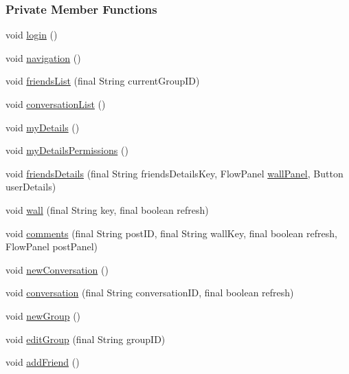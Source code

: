 \subsubsection*{Private Member Functions}
\begin{DoxyCompactItemize}
\item 
void \hyperlink{classballmerpeak_1_1turtlenet_1_1client_1_1frontend_a0e5a972d2f4619b2ebc2257ae1ca1288}{login} ()
\item 
void \hyperlink{classballmerpeak_1_1turtlenet_1_1client_1_1frontend_ae632d3d6bfd5ed81da02b4bf53fc9327}{navigation} ()
\item 
void \hyperlink{classballmerpeak_1_1turtlenet_1_1client_1_1frontend_a2fe4471c89ba970c517388d212b617d6}{friends\-List} (final String current\-Group\-I\-D)
\item 
void \hyperlink{classballmerpeak_1_1turtlenet_1_1client_1_1frontend_a87b09347320292a852b37e97c01b2ea2}{conversation\-List} ()
\item 
void \hyperlink{classballmerpeak_1_1turtlenet_1_1client_1_1frontend_aa0f7dea95f68603b6c8e17c8b97733c7}{my\-Details} ()
\item 
void \hyperlink{classballmerpeak_1_1turtlenet_1_1client_1_1frontend_ace0e354862cbae6e9f10d1c4be6db11d}{my\-Details\-Permissions} ()
\item 
void \hyperlink{classballmerpeak_1_1turtlenet_1_1client_1_1frontend_a8686e8f6959324ea74e98cf8a89eeca0}{friends\-Details} (final String friends\-Details\-Key, Flow\-Panel \hyperlink{classballmerpeak_1_1turtlenet_1_1client_1_1frontend_aabfe3b109c5a81d51ede885f008d7530}{wall\-Panel}, Button user\-Details)
\item 
void \hyperlink{classballmerpeak_1_1turtlenet_1_1client_1_1frontend_a8911e15af92aa31b90cdc2ec0cd78a3a}{wall} (final String key, final boolean refresh)
\item 
void \hyperlink{classballmerpeak_1_1turtlenet_1_1client_1_1frontend_a936e2b44e7f19a58586752ae5317bdfd}{comments} (final String post\-I\-D, final String wall\-Key, final boolean refresh, Flow\-Panel post\-Panel)
\item 
void \hyperlink{classballmerpeak_1_1turtlenet_1_1client_1_1frontend_aa36f8f33cf634edf044aa9d31790ac67}{new\-Conversation} ()
\item 
void \hyperlink{classballmerpeak_1_1turtlenet_1_1client_1_1frontend_a27cabae704f2e4164bfcb5b18184144d}{conversation} (final String conversation\-I\-D, final boolean refresh)
\item 
void \hyperlink{classballmerpeak_1_1turtlenet_1_1client_1_1frontend_a931cf38d0a5bb38b3d15b7c04eaaa6b7}{new\-Group} ()
\item 
void \hyperlink{classballmerpeak_1_1turtlenet_1_1client_1_1frontend_a8017892ef2b857bdac093a24ddb5dfa3}{edit\-Group} (final String group\-I\-D)
\item 
void \hyperlink{classballmerpeak_1_1turtlenet_1_1client_1_1frontend_a0862ca49f2b011650c302787602c1395}{add\-Friend} ()
\end{DoxyCompactItemize}
